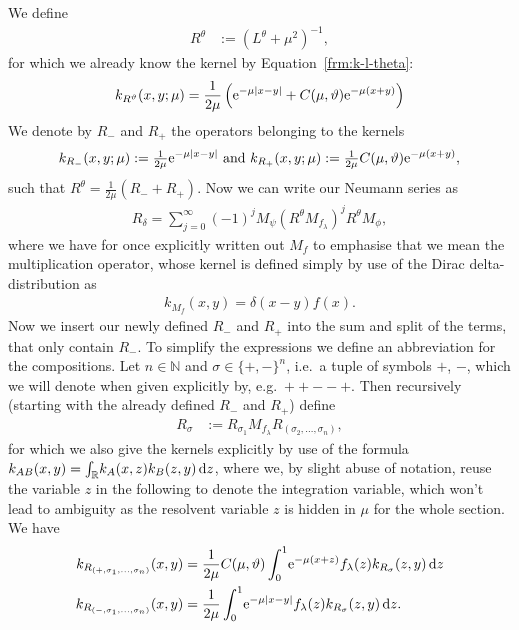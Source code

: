 We define
\begin{align}
  \label{frm:r-theta}
  R^\theta &:= (L^\theta + \mu^2)^{-1},
\end{align}
for which we already know the kernel by Equation~\eqref{frm:k-l-theta}:
\begin{align*}
  k_{R^\theta}(x,y;\mu) = \frac1{2\mu} \left( \Eto{-\mu\Abs{x-y}} +
  C(\mu,\theta)\Eto{-\mu(x+y)}\right)
\end{align*}
We denote by $R_-$ and $R_+$ the operators belonging to the kernels
\begin{align*}
  k_{R_-}(x,y;\mu) := \tfrac1{2\mu}\Eto{-\mu\Abs{x-y}} \text{ and }
  k_{R_+}(x,y;\mu) := \tfrac1{2\mu}C(\mu,\theta)\Eto{-\mu(x+y)},
\end{align*}
such that $R^\theta = \tfrac1{2\mu}(R_- + R_+)$. Now we can write our Neumann
series as
\begin{align*}
  R_\delta = \sum_{j=0}^\infty (-1)^j M_\psi\left(R^\theta
  M_{f_\lambda}\right)^j R^\theta M_\phi,
\end{align*}
where we have for once explicitly written out $M_f$ to emphasise that we mean
the multiplication operator, whose kernel is defined simply by use of the Dirac
delta-distribution as
\begin{align*}
  k_{M_f}(x,y) = \delta(x-y)f(x).
\end{align*}
Now we insert our newly defined $R_-$ and $R_+$ into the sum and split of the
terms, that only contain $R_-$. To simplify the expressions we define an
abbreviation for the compositions. Let $n\in\mathbb{N}$ and $\sigma \in
\{+,-\}^n$, i.e.\ a tuple of symbols $+$, $-$, which we will denote when given
explicitly by, e.g.\ $++--+$. Then recursively (starting with
the already defined $R_-$ and $R_+$) define
\begin{align}
  R_\sigma &:= R_{\sigma_1} M_{f_\lambda}
  R_{(\sigma_2,\ldots,\sigma_{n})},
\end{align}
for which we also give the kernels explicitly by use of the formula $k_{AB}(x,y) =
\Integ{\mathbb{R}}{z}{k_A(x,z)k_B(z,y)}$, where we, by slight abuse of notation,
reuse the variable $z$ in the following to denote the integration variable,
which won't lead to ambiguity as the resolvent variable $z$ is hidden in $\mu$
for the whole section. We have
\begin{align}
  k_{R_{(+,\sigma_1,\ldots,\sigma_n)}}(x,y) &=
  \frac1{2\mu}C(\mu,\theta)\Int{z}{\Eto{-\mu(x+z)}f_\lambda(z)
  k_{R_\sigma}(z,y)} \\
  k_{R_{(-,\sigma_1,\ldots,\sigma_n)}}(x,y) &=
  \frac1{2\mu}\Int{z}{\Eto{-\mu\Abs{x-y}}f_\lambda(z) k_{R_\sigma}(z,y)}.
\end{align}

